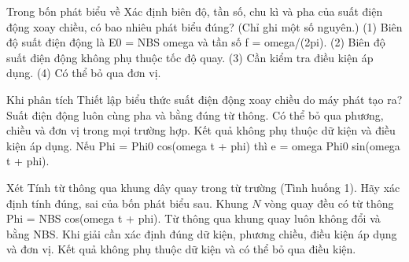 \begin{ex}
Trong bốn phát biểu về Xác định biên độ, tần số, chu kì và pha của suất điện động xoay chiều, có bao nhiêu phát biểu đúng? (Chỉ ghi một số nguyên.) (1) Biên độ suất điện động là E0 = NBS omega và tần số f = omega/(2pi). (2) Biên độ suất điện động không phụ thuộc tốc độ quay. (3) Cần kiểm tra điều kiện áp dụng. (4) Có thể bỏ qua đơn vị.
\end{ex}

\begin{ex}
Khi phân tích Thiết lập biểu thức suất điện động xoay chiều do máy phát tạo ra?
\choice
{Suất điện động luôn cùng pha và bằng đúng từ thông.}
{Có thể bỏ qua phương, chiều và đơn vị trong mọi trường hợp.}
{Kết quả không phụ thuộc dữ kiện và điều kiện áp dụng.}
{\True Nếu Phi = Phi0 cos(omega t + phi) thì e = omega Phi0 sin(omega t + phi).}
\end{ex}

\begin{ex}
Xét Tính từ thông qua khung dây quay trong từ trường (Tình huống 1). Hãy xác định tính đúng, sai của bốn phát biểu sau.
\choiceTF
{\True Khung $N$ vòng quay đều có từ thông Phi = NBS cos(omega t + phi).}
{Từ thông qua khung quay luôn không đổi và bằng NBS.}
{\True Khi giải cần xác định đúng dữ kiện, phương chiều, điều kiện áp dụng và đơn vị.}
{Kết quả không phụ thuộc dữ kiện và có thể bỏ qua điều kiện.}
\end{ex}

